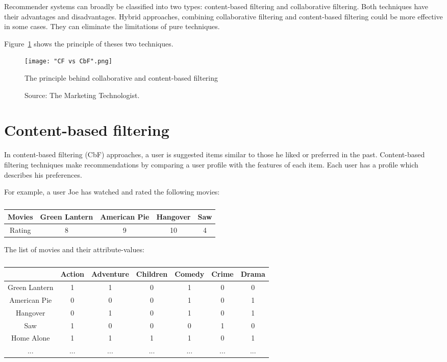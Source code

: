 \documentclass[oneside,13pt]{extreport}
\begin{document}
Recommender systems can broadly be classified into two types: content-based filtering and collaborative filtering. Both techniques have their advantages and disadvantages. Hybrid approaches, combining collaborative filtering and content-based filtering could be more effective in some cases. They can eliminate the limitations of pure techniques.

Figure~\ref{fig:CF vs CbF} shows the principle of theses two techniques.
\clearpage
\begin{figure}[h!]
    \centering
    \texttt{[image: "CF vs CbF".png]} 
    \caption{The principle behind collaborative and content-based filtering}
    \!\!\!\!
    \caption*{Source: The Marketing Technologist.}
    \label{fig:CF vs CbF}
\end{figure}

\section{Content-based filtering}
In content-based filtering (CbF) approaches, a user is suggested items similar to those he liked or preferred in the past. Content-based filtering techniques  make recommendations by comparing a user profile with the features of each item. Each user has a profile which describes his preferences.  

For example, a user Joe has watched and rated the following movies: 
\begin{table}[h!]
    \small\centering
    \begin{tabular}{|c|c|c|c|c|}
        \hline
        Movies & Green Lantern & American Pie & Hangover & Saw   \\
        \hline
        Rating & 8 & 9 & 10 & 4 \\
        \hline
    \end{tabular}
    \caption*{}
\end{table}

The list of movies and their attribute-values:
\begin{table}[h!]
    \small\centering
    \begin{tabular}{|c|c|c|c|c|c|c|}
        \hline
         & Action & Adventure & Children & Comedy & Crime & Drama   \\
        \hline
        Green Lantern & 1 & 1 & 0 & 1 & 0 & 0 \\
        \hline
        American Pie & 0 & 0 & 0 & 1 & 0 & 1 \\
        \hline
        Hangover & 0 & 1 & 0 & 1 & 0 & 1 \\
        \hline
        Saw & 1 & 0 & 0 & 0 & 1 & 0 \\
        \hline
        Home Alone & 1 & 1 & 1 & 1 & 0 & 1 \\
        \hline
        ... & ... & ... & ... & ... & ... & ... \\
        \hline
    \end{tabular}
    \caption*{}
\end{table}
\end{document}
